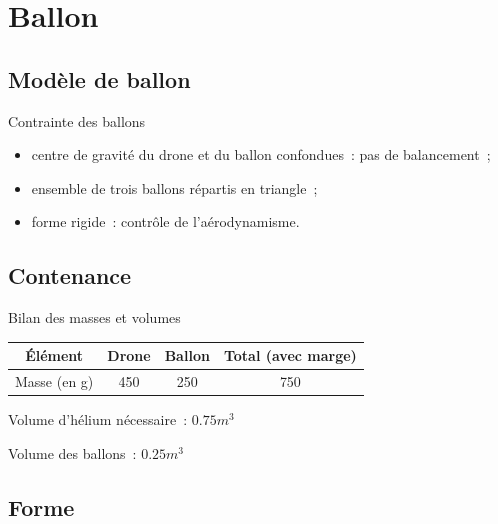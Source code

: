 \section{Ballon}

\subsection{Modèle de ballon}

\begin{frame}{Contrainte des ballons}
	\begin{itemize}
		\item centre de gravité du drone et du ballon confondues~: pas de balancement~;
		\item ensemble de trois ballons répartis en triangle~;
		\item forme rigide~: contrôle de l'aérodynamisme.
	\end{itemize}
\end{frame}

\subsection{Contenance}

\begin{frame}{Bilan des masses et volumes}
	\begin{center}
		\begin{tabular}{|c|c|c|c|}
			\hline
			Élément & Drone & Ballon & Total (avec marge) \\
			\hline
			Masse (en g) & 450 & 250 & 750 \\
			\hline
		\end{tabular}

	\end{center}

  Volume d'hélium nécessaire~: $0.75 m^3$
  
  Volume des ballons~: $0.25 m^3$
\end{frame}

\subsection{Forme}

